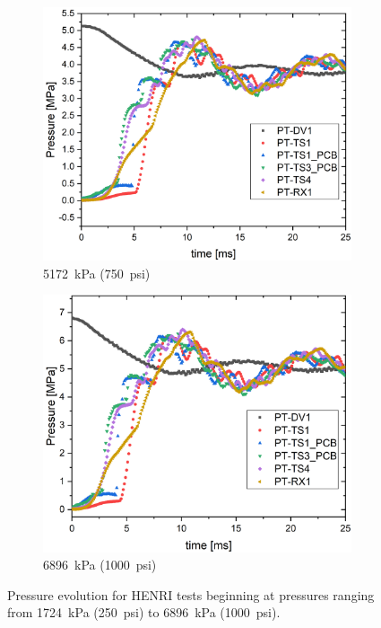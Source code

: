 \begin{figure}[htbp]
    \vspace{8pt}
    \begin{subfigure}{0.49\textwidth}
        \centering
        \includegraphics[width=\textwidth]{results/plots/750psi_Mpa_25.png}
        \caption{\SI{5172}{\kilo\pascal} (\SI{750}{psi})}
        \label{fig:piston multi 750}
    \end{subfigure}
    \hfill
    \begin{subfigure}{0.49\textwidth}
        \centering
        \includegraphics[width=\textwidth]{results/plots/1000psi_Mpa_25.png}
        \caption{\SI{6896}{\kilo\pascal} (\SI{1000}{psi})}
        \label{fig:piston multi 1000}
    \end{subfigure}

    \caption{Pressure evolution for HENRI tests beginning at pressures ranging from \SI{1724}{\kilo\pascal} (\SI{250}{psi}) to \SI{6896}{\kilo\pascal} (\SI{1000}{psi}).}
    \label{fig:piston multi}
    \vspace{16pt}
\end{figure}

